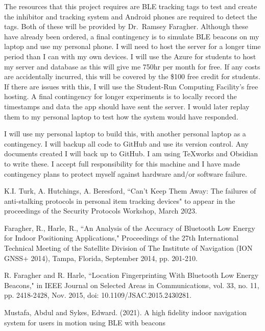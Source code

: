 \documentclass{article}
\begin{document}
The resources that this project requires are BLE tracking tags to test and create the inhibitor and tracking system and
Android phones are required to detect the tags.
Both of these will be provided by Dr.~Ramsey Faragher.
 Although these have already been ordered, a final contingency is to simulate BLE beacons on my laptop and use my personal phone.
I will need to host the server for a longer time period than I can with my own devices. I will use the Azure for students to host my server and database as this will give me 750hr per month for free. If any costs are accidentally incurred, this will be covered by the \$100 free credit for students. If there are issues with this, I will use the Student-Run Computing Facility's free hosting. A final contingency for longer experiments is to locally record the timestamps and data the app should have sent the server. I would later replay them to my personal laptop to test how the system would have responded.


I will use my personal laptop to build this, with another personal laptop as a contingency. I will backup all code to GitHub and use its version control. Any documents created I will back up to GitHub. I am using TeXworks and Obsidian to write these. I accept full responsibility for this machine and I have made contingency plans to protect myself against hardware and/or software failure.


\begin{thebibliography}{9}
\frenchspacing
{} K.I. Turk, A. Hutchings, A. Beresford, ``Can’t Keep Them Away: The failures of anti-stalking protocols in personal item tracking devices" to appear in the proceedings of the Security Protocols Workshop, March 2023.


 Faragher, R., Harle, R., ``An Analysis of the Accuracy of Bluetooth Low Energy for Indoor Positioning Applications," Proceedings of the 27th International Technical Meeting of the Satellite Division of The Institute of Navigation (ION GNSS+ 2014), Tampa, Florida, September 2014, pp. 201-210.


R. Faragher and R. Harle, ``Location Fingerprinting With Bluetooth Low Energy Beacons," in IEEE Journal on Selected Areas in Communications, vol. 33, no. 11, pp. 2418-2428, Nov. 2015, doi: 10.1109/JSAC.2015.2430281.


 Mustafa, Abdul and Sykes, Edward. (2021). A high fidelity indoor navigation system for users in motion using BLE with beacons
\end{thebibliography}
\end{document}
